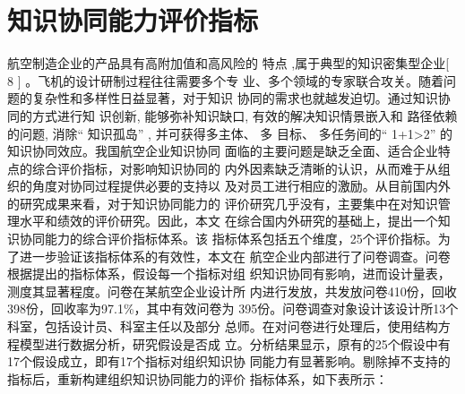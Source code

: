 \documentclass[adobefonts]{ctexart}
\begin{document}
\section{知识协同能力评价指标}
航空制造企业的产品具有高附加值和高风险的
特点 ,属于典型的知识密集型企业[ 8 ] 。飞机的设计研制过程往往需要多个专
业、多个领域的专家联合攻关。随着问题的复杂性和多样性日益显著，对于知识
协同的需求也就越发迫切。通过知识协同的方式进行知
识创新, 能够弥补知识缺口, 有效的解决知识情景嵌入和
路径依赖的问题, 消除“ 知识孤岛” , 并可获得多主体、 多
目标、 多任务间的“ 1+1>2” 的知识协同效应。我国航空企业知识协同
面临的主要问题是缺乏全面、适合企业特点的综合评价指标，对影响知识协同的
内外因素缺乏清晰的认识，从而难于从组织的角度对协同过程提供必要的支持以
及对员工进行相应的激励。从目前国内外的研究成果来看，对于知识协同能力的
评价研究几乎没有，主要集中在对知识管理水平和绩效的评价研究。因此，本文
在综合国内外研究的基础上，提出一个知识协同能力的综合评价指标体系。该
指标体系包括五个维度，25个评价指标。为了进一步验证该指标体系的有效性，本文在
航空企业内部进行了问卷调查。问卷根据提出的指标体系，假设每一个指标对组
织知识协同有影响，进而设计量表，测度其显著程度。问卷在某航空企业设计所
内进行发放，共发放问卷410份，回收398份，回收率为97.1\%，其中有效问卷为
395份。问卷调查对象设计该设计所13个科室，包括设计员、科室主任以及部分
总师。在对问卷进行处理后，使用结构方程模型进行数据分析，研究假设是否成
立。分析结果显示，原有的25个假设中有17个假设成立，即有17个指标对组织知识协
同能力有显著影响。剔除掉不支持的指标后，重新构建组织知识协同能力的评价
指标体系，如下表所示：
\end{document}
